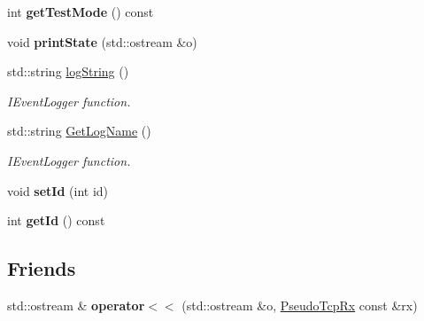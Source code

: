 \begin{DoxyCompactItemize}
\item 
\hypertarget{classPseudoTcp_1_1PseudoTcpRx_ae4ff932fdc6e913a59c7bb2f3cd14bd6}{
int {\bfseries getTestMode} () const }
\label{classPseudoTcp_1_1PseudoTcpRx_ae4ff932fdc6e913a59c7bb2f3cd14bd6}

\item 
\hypertarget{classPseudoTcp_1_1PseudoTcpRx_ada5eb147bc771df7dd4e32c11cc77c4c}{
void {\bfseries printState} (std::ostream \&o)}
\label{classPseudoTcp_1_1PseudoTcpRx_ada5eb147bc771df7dd4e32c11cc77c4c}

\item 
\hypertarget{classPseudoTcp_1_1PseudoTcpRx_abad5470549d03a14436775ac52acd7d0}{
std::string \hyperlink{classPseudoTcp_1_1PseudoTcpRx_abad5470549d03a14436775ac52acd7d0}{logString} ()}
\label{classPseudoTcp_1_1PseudoTcpRx_abad5470549d03a14436775ac52acd7d0}

\begin{DoxyCompactList}\small\item\em IEventLogger function. \item\end{DoxyCompactList}\item 
\hypertarget{classPseudoTcp_1_1PseudoTcpRx_aa85e034bcce1875d4295d96c54ab74a5}{
std::string \hyperlink{classPseudoTcp_1_1PseudoTcpRx_aa85e034bcce1875d4295d96c54ab74a5}{GetLogName} ()}
\label{classPseudoTcp_1_1PseudoTcpRx_aa85e034bcce1875d4295d96c54ab74a5}

\begin{DoxyCompactList}\small\item\em IEventLogger function. \item\end{DoxyCompactList}\item 
\hypertarget{classPseudoTcp_1_1PseudoTcpRx_a46d679252d77f1c7145fa03aae6597a2}{
void {\bfseries setId} (int id)}
\label{classPseudoTcp_1_1PseudoTcpRx_a46d679252d77f1c7145fa03aae6597a2}

\item 
\hypertarget{classPseudoTcp_1_1PseudoTcpRx_a0f1fc51ed563586383efd74afcd90bcf}{
int {\bfseries getId} () const }
\label{classPseudoTcp_1_1PseudoTcpRx_a0f1fc51ed563586383efd74afcd90bcf}

\end{DoxyCompactItemize}
\subsection*{Friends}
\begin{DoxyCompactItemize}
\item 
\hypertarget{classPseudoTcp_1_1PseudoTcpRx_af906343529e16495228f9852e1ca83c6}{
std::ostream \& {\bfseries operator$<$$<$} (std::ostream \&o, \hyperlink{classPseudoTcp_1_1PseudoTcpRx}{PseudoTcpRx} const \&rx)}
\label{classPseudoTcp_1_1PseudoTcpRx_af906343529e16495228f9852e1ca83c6}

\end{DoxyCompactItemize}


